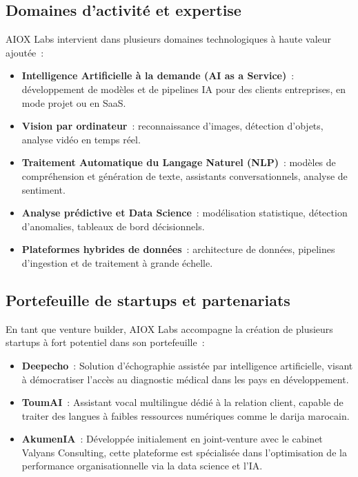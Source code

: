 \subsection{Domaines d'activité et expertise}

AIOX Labs intervient dans plusieurs domaines technologiques à haute valeur ajoutée~:

\begin{itemize}
  \item \textbf{Intelligence Artificielle à la demande (AI as a Service)}~: développement de modèles et de pipelines IA pour des clients entreprises, en mode projet ou en SaaS.
  \item \textbf{Vision par ordinateur}~: reconnaissance d'images, détection d'objets, analyse vidéo en temps réel.
  \item \textbf{Traitement Automatique du Langage Naturel (NLP)}~: modèles de compréhension et génération de texte, assistants conversationnels, analyse de sentiment.
  \item \textbf{Analyse prédictive et Data Science}~: modélisation statistique, détection d'anomalies, tableaux de bord décisionnels.
  \item \textbf{Plateformes hybrides de données}~: architecture de données, pipelines d'ingestion et de traitement à grande échelle.
\end{itemize}

\subsection{Portefeuille de startups et partenariats}

En tant que venture builder, AIOX Labs accompagne la création de plusieurs startups à fort potentiel dans son portefeuille~:

\begin{itemize}
  \item \textbf{Deepecho}~: Solution d'échographie assistée par intelligence artificielle, visant à démocratiser l'accès au diagnostic médical dans les pays en développement.
  \item \textbf{ToumAI}~: Assistant vocal multilingue dédié à la relation client, capable de traiter des langues à faibles ressources numériques comme le darija marocain.
  \item \textbf{AkumenIA}~: Développée initialement en joint-venture avec le cabinet Valyans Consulting, cette plateforme est spécialisée dans l'optimisation de la performance organisationnelle via la data science et l'IA.
\end{itemize}

